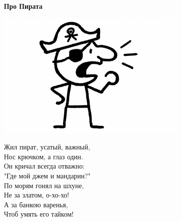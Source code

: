 \vspace*{\fill}
\begin{center}
  {\huge\textbf{Про Пирата}}

  \vspace{1.5em}  \includegraphics[width=0.7\textwidth]{pictures/pirat.png}
  \vspace{4em}
  \parbox{0.6\textwidth}{
    \LARGE
    \begin{spacing}{1.2}
      Жил пират, усатый, важный,\\
      Нос крючком, а глаз один.\\
      Он кричал всегда отважно:\\
      "Где мой джем и мандарин?"\\
      \vspace{1em}
      По морям гонял на шхуне,\\
      Не за златом, о-хо-хо!\\
      А за банкою варенья,\\
      Чтоб умять его тайком! %
    \end{spacing}
      
  }
\end{center}
\vspace*{\fill}